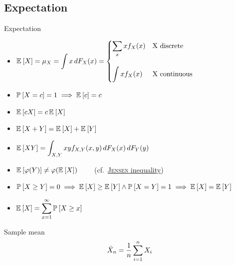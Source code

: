 \documentclass[landscape]{article}
\begin{document}
\begin{multicols*}{2}

\section{Expectation}

Expectation
\begin{itemize}
  \item $\E{X} = \mu_X = \displaystyle \int x \dfx =
    \begin{cases}
      \displaystyle\sum_x xf_X(x) & \text{X discrete} \\\\
      \displaystyle\int xf_X(x) & \text{X continuous}
    \end{cases}$
  \item $\Pr{X=c}=1 \imp \E{c} = c$
  \item $\E{cX} = c\,\E{X}$
  \item $\E{X+Y} = \E{X}+\E{Y}$
  \item $\E{XY} = \displaystyle\int_{X,Y} xy f_{X,Y}(x,y)\dfx\dfy$
  \item $\E{\transform(Y)} \neq \transform(\E{X}) \qquad$ 
    (cf.~\hyperref[jensen]{\textsc{Jensen} inequality})
  \item $\Pr{X\ge Y} = 0 \imp \E{X}\ge\E{Y} 
    \wedge \Pr{X=Y}=1 \imp \E{X}=\E{Y}$
  \item $\E{X} = \displaystyle\sum_{x=1}^\infty \Pr{X\ge x}$
\end{itemize}

Sample mean
$$\samplemean = \frac{1}{n}\sum_{i=1}^n X_i$$


\end{multicols*}
\end{document}
